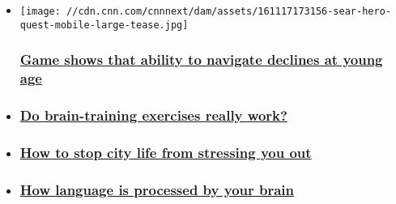 \begin{itemize}
\item
  \href{/2016/05/04/health/dementia-game-sea-hero-quest/index.html}{}

  \texttt{[image: //cdn.cnn.com/cnnnext/dam/assets/161117173156-sear-hero-quest-mobile-large-tease.jpg]}

  \hypertarget{game-shows-that-ability-to-navigate-declines-at-young-age}{%
  \subsubsection{\texorpdfstring{\href{/2016/05/04/health/dementia-game-sea-hero-quest/index.html}{Game
  shows that ability to navigate declines at young
  age}}{Game shows that ability to navigate declines at young age}}\label{game-shows-that-ability-to-navigate-declines-at-young-age}}
\item
  \hypertarget{do-brain-training-exercises-really-work}{%
  \subsubsection{\texorpdfstring{\href{/2016/10/20/health/brain-training-exercises/index.html}{Do
  brain-training exercises really
  work?}}{Do brain-training exercises really work?}}\label{do-brain-training-exercises-really-work}}
\item
  \hypertarget{how-to-stop-city-life-from-stressing-you-out}{%
  \subsubsection{\texorpdfstring{\href{/2016/10/11/health/reducing-stress-in-the-city-can-improve-mental-health/index.html}{How
  to stop city life from stressing you
  out}}{How to stop city life from stressing you out}}\label{how-to-stop-city-life-from-stressing-you-out}}
\item
  \hypertarget{how-language-is-processed-by-your-brain}{%
  \subsubsection{\texorpdfstring{\href{/2016/08/16/health/language-in-the-human-brain/index.html}{How
  language is processed by your
  brain}}{How language is processed by your brain}}\label{how-language-is-processed-by-your-brain}}
\end{itemize}

